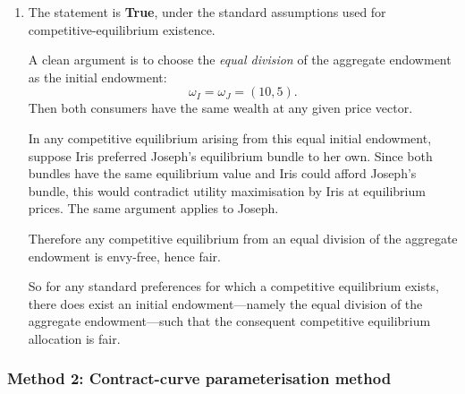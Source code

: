 \documentclass[12pt]{article}
\begin{document}
\begin{enumerate}[label=(\alph*)]
    At the proposed allocation,
    \[
    \text{Iris gets }(12,4),\qquad \text{Joseph gets }(8,6).
    \]

    Iris' utility from her own bundle is
    \[
    U_I(12,4)=\min\{12,12\}=12.
    \]
    If Iris were given Joseph's bundle instead, her utility would be
    \[
    U_I(8,6)=\min\{8,18\}=8.
    \]
    Hence Iris does not envy Joseph.

    Joseph's utility from his own bundle is
    \[
    U_J(8,6)=48.
    \]
    If Joseph were given Iris' bundle instead, his utility would be
    \[
    U_J(12,4)=48.
    \]
    So Joseph is indifferent between the two bundles and therefore does not envy Iris.

    The allocation is also feasible because
    \[
    (12+8,\,4+6)=(20,10).
    \]

    Hence the allocation is envy-free and feasible, so it is fair.

    \item
    The statement is \textbf{True}, under the standard assumptions used for competitive-equilibrium existence.

    A clean argument is to choose the \emph{equal division} of the aggregate endowment as the initial endowment:
    \[
    \omega_I=\omega_J=(10,5).
    \]
    Then both consumers have the same wealth at any given price vector.

    In any competitive equilibrium arising from this equal initial endowment, suppose Iris preferred Joseph's equilibrium bundle to her own. Since both bundles have the same equilibrium value and Iris could afford Joseph's bundle, this would contradict utility maximisation by Iris at equilibrium prices. The same argument applies to Joseph.

    Therefore any competitive equilibrium from an equal division of the aggregate endowment is envy-free, hence fair.

    So for any standard preferences for which a competitive equilibrium exists, there does exist an initial endowment---namely the equal division of the aggregate endowment---such that the consequent competitive equilibrium allocation is fair.
\end{enumerate}

\newpage
\subsubsection{Method 2: Contract-curve parameterisation method}
\end{document}
